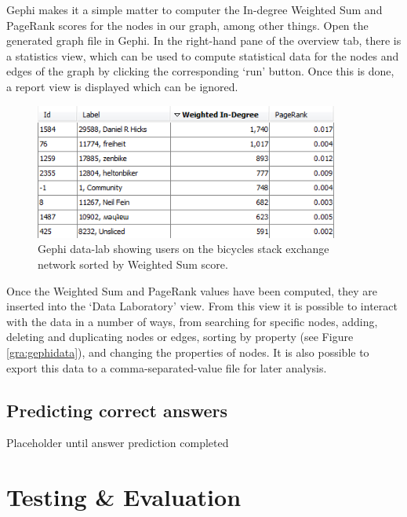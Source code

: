 \documentclass[]{final_report}
\begin{document}
Gephi makes it a simple matter to computer the In-degree Weighted Sum and PageRank scores for the nodes in our graph, among other things. Open the generated graph file in Gephi. In the right-hand pane of the overview tab, there is a statistics view, which can be used to compute statistical data for the nodes and edges of the graph by clicking the corresponding `run' button. Once this is done, a report view is displayed which can be ignored.


\begin{figure}[ht!]
\centering
\includegraphics[width=100mm]{chap4/gephidata.PNG}
\caption{Gephi data-lab showing users on the bicycles stack exchange network sorted by Weighted Sum score.}
\end{figure}\label{gra:gephidata}

Once the Weighted Sum and PageRank values have been computed, they are inserted into the `Data Laboratory' view. From this view it is possible to interact with the data in a number of ways, from searching for specific nodes, adding, deleting and duplicating nodes or edges, sorting by property (see Figure \ref{gra:gephidata}), and changing the properties of nodes. It is also possible to export this data to a comma-separated-value file for later analysis.

\section{Predicting correct answers}

Placeholder until answer prediction completed

\chapter{Testing \& Evaluation}
\end{document}
